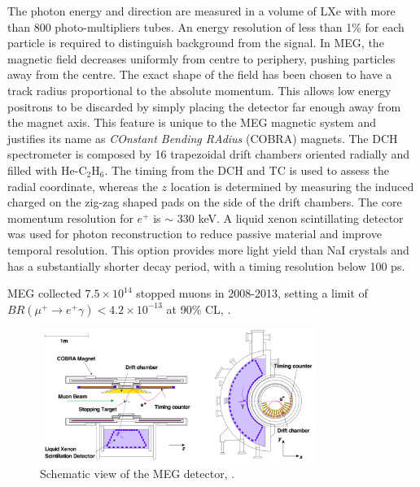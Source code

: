The photon energy and direction are measured in a volume of LXe with more than 800 photo-multipliers tubes. 
An energy resolution of less than 1\% for each particle is required to distinguish background from the signal. 
In MEG, the magnetic field decreases uniformly from centre to periphery, pushing particles away from the centre. 
The exact shape of the field has been chosen to have a track radius proportional to the absolute momentum.
This allows low energy positrons to be discarded by simply placing the detector far enough away from the magnet axis. 
This feature is unique to the MEG magnetic system and justifies its name as \textit{COnstant Bending RAdius} (COBRA) magnets.
The DCH spectrometer is composed by 16 trapezoidal drift chambers oriented radially and filled with He-C$_2$H$_6$. 
The timing from the DCH and TC is used to assess the radial coordinate, whereas the $z$ location is determined by measuring the induced
charged on the zig-zag shaped pads on the side of the drift chambers. The core momentum resolution for $e^+$ is $\sim$ 330 keV.
A liquid xenon scintillating detector was used for photon reconstruction to reduce passive material and improve temporal resolution. 
This option provides more light yield than NaI crystals 
and has a substantially shorter decay period, with a timing resolution below 100 ps.

MEG collected $7.5 \times 10^{14}$ stopped muons in 2008-2013, 
setting a limit of $BR(\mu^+ \rightarrow e^+ \gamma) < 4.2 \times 10^{-13}$ at 90\% CL, \cite{megi}.
\begin{figure}[!h]
\centering
\includegraphics[width =0.8\textwidth]{figures/png/Screenshot_20240321_115127.png}
\caption[MEG detector.]{Schematic view of the MEG detector, \cite{megi}.}
\label{fig:meg}
\end{figure}
